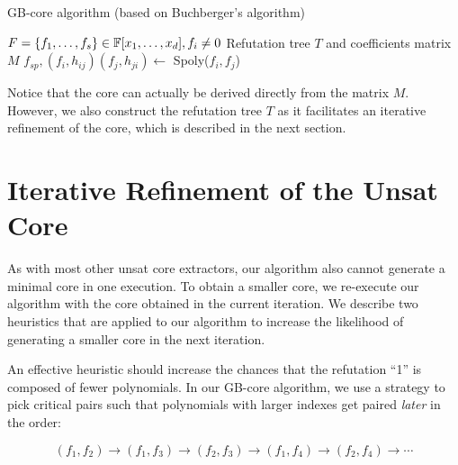 \begin{algorithm}[H]
 \caption{GB-core algorithm (based on Buchberger's algorithm)}
 \label{algo:gbcore}
 \begin{algorithmic}[1]

 \REQUIRE $F = \{f_1, \dots, f_s\} \in {\mathbb{F}}[x_1, \dots, x_d], f_i\neq 0$
 \ENSURE Refutation tree $T$ and coefficients matrix $M$
 	\STATE  $f_{sp},(f_{i},h_{ij})(f_{j},h_{ji}) \gets$ Spoly($f_i,f_j$) 
 	\ENDIF
 	\ENDIF
 \ENDFOR
 \end{algorithmic}
 \end{algorithm}


Notice that the core can actually be derived directly from the matrix 
$M$. However, we also construct the refutation tree $T$ as it
facilitates an iterative refinement of the core, which is described
in the next section. 

\section{Iterative Refinement of the Unsat Core}
\label{sec:iter}

As with most other unsat core extractors, our algorithm also cannot
generate a minimal core in one execution. To obtain a smaller core, we
 re-execute our algorithm with the core obtained in the current
iteration. We describe two heuristics that are applied to our
algorithm to increase the likelihood of generating a smaller core in
the next iteration.  

An effective heuristic should increase the chances that the refutation
``1'' is composed of fewer polynomials.  In our GB-core algorithm, we
use a strategy to pick critical pairs such that polynomials with
larger indexes get paired {\it later} in the order:

$$(f_1,f_2)\to(f_1,f_3)\to(f_2,f_3)\to(f_1,f_4)\to(f_2,f_4)\to\cdots$$

